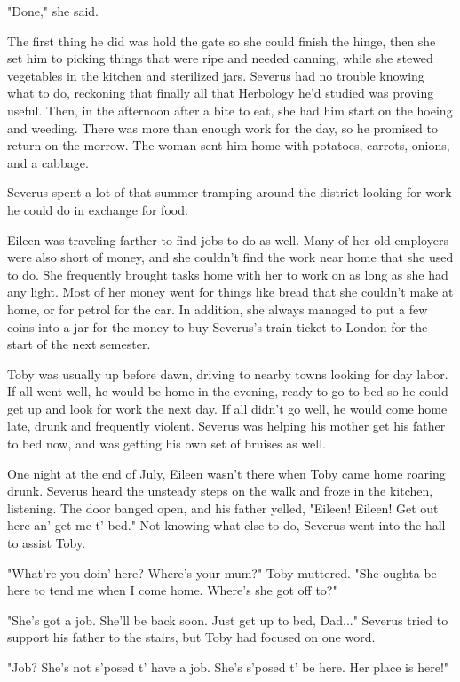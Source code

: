 \documentclass[a4paper,11pt]{article}
\begin{document}
"Done," she said.

The first thing he did was hold the gate so she could finish the hinge, then she set him to picking things that were ripe and needed canning, while she stewed vegetables in the kitchen and sterilized jars. Severus had no trouble knowing what to do, reckoning that finally all that Herbology he'd studied was proving useful. Then, in the afternoon after a bite to eat, she had him start on the hoeing and weeding. There was more than enough work for the day, so he promised to return on the morrow. The woman sent him home with potatoes, carrots, onions, and a cabbage.

Severus spent a lot of that summer tramping around the district looking for work he could do in exchange for food.

Eileen was traveling farther to find jobs to do as well. Many of her old employers were also short of money, and she couldn't find the work near home that she used to do. She frequently brought tasks home with her to work on as long as she had any light. Most of her money went for things like bread that she couldn't make at home, or for petrol for the car. In addition, she always managed to put a few coins into a jar for the money to buy Severus's train ticket to London for the start of the next semester.

Toby was usually up before dawn, driving to nearby towns looking for day labor. If all went well, he would be home in the evening, ready to go to bed so he could get up and look for work the next day. If all didn't go well, he would come home late, drunk and frequently violent. Severus was helping his mother get his father to bed now, and was getting his own set of bruises as well.

One night at the end of July, Eileen wasn't there when Toby came home roaring drunk. Severus heard the unsteady steps on the walk and froze in the kitchen, listening. The door banged open, and his father yelled, "Eileen! Eileen! Get out here an' get me t' bed." Not knowing what else to do, Severus went into the hall to assist Toby.

"What're you doin' here? Where's your mum?" Toby muttered. "She oughta be here to tend me when I come home. Where's she got off to?"

"She's got a job. She'll be back soon. Just get up to bed, Dad..." Severus tried to support his father to the stairs, but Toby had focused on one word.

"Job? She's not s'posed t' have a job. She's s'posed t' be here. Her place is here!"
\end{document}
